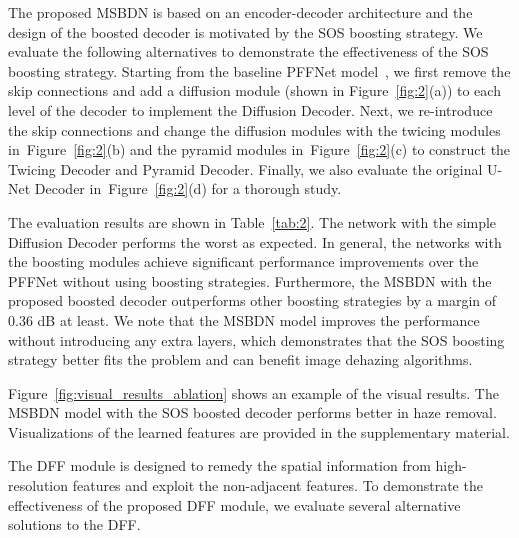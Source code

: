 \documentclass[10pt,twocolumn,letterpaper]{article}
\newcommand{\figref}[1]{Figure~\ref{fig:#1}}
\begin{document}
The proposed MSBDN is based on an encoder-decoder architecture and the design of the boosted decoder is motivated by the SOS boosting strategy.
We evaluate the following alternatives to demonstrate the effectiveness of the SOS boosting strategy.
Starting from the baseline PFFNet model~\cite{PFFNet},
  we first remove the skip connections and add a diffusion module (shown in \figref{2}(a)) to each level of the decoder to implement the Diffusion Decoder.
Next, we re-introduce the skip connections and change the diffusion modules with the twicing modules in~\figref{2}(b) and the pyramid modules in~\figref{2}(c)
  to construct the Twicing Decoder and Pyramid Decoder.
Finally, we also evaluate the original U-Net Decoder in~\figref{2}(d) for a thorough study.


  The evaluation results are shown in Table~\ref{tab:2}.
The network with the simple Diffusion Decoder performs the worst as expected.
In general, the networks with the boosting modules achieve significant performance improvements over the PFFNet without using boosting strategies.
Furthermore, the MSBDN with the proposed boosted decoder outperforms other boosting strategies by a margin of 0.36 dB at least.
We note that the MSBDN model improves the performance without introducing any extra layers,
which demonstrates that the SOS boosting strategy better fits the problem and can benefit image dehazing algorithms.


  \figref{visual_results_ablation} shows an example of the visual results.
The MSBDN model with the SOS boosted decoder performs better in haze removal.
Visualizations of the learned features are provided in the supplementary material.
  
  
  
  The DFF module is designed to remedy the spatial information from high-resolution features and exploit the non-adjacent features.
To demonstrate the effectiveness of the proposed DFF module, we evaluate several alternative solutions to the DFF.
\end{document}
